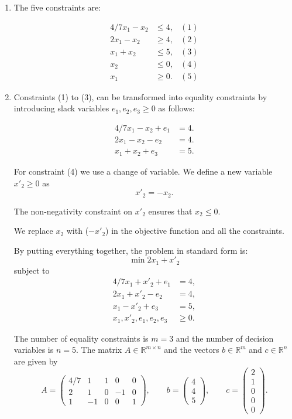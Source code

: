\begin{enumerate}
\item The five constraints are:

\begin{align*}
4/7x_1 - x_2  & \leq 4,& (1)  \\
2x_1  - x_2 & \geq 4,& (2)   \\
x_1+ x_2  & \leq 5, & (3) \\
x_2 &\leq 0, & (4)\\
x_1 &\geq 0. & (5)
\end{align*} 

\item Constraints (1) to (3), can be transformed into equality
  constraints by introducing slack variables $e_1, e_2, e_3 \geq 0$ as
  follows: 

\begin{align*}
4/7x_1 - x_2  + e_1 & = 4.  \\
2x_1  - x_2 - e_2 & = 4.   \\
x_1+ x_2  + e_3 & =5. 
\end{align*} 

For constraint (4) we use a change of variable. We define a new variable $ x'_2 \geq 0 $ as
\begin{equation*}
x'_2 = - x_2.
\end{equation*}

The non-negativity constraint on $ x'_2 $ ensures that $ x_2 \leq 0 $.

We replace $ x_2 $ with ($ -x'_2 $) in the objective function and all the constraints.
 
By putting  everything  together, the  problem in standard form is:
\[
\min  2 x_1 + x'_2
\]
subject to
\begin{align*}
 4/7x_1 + x'_2  + e_1 & = 4,  \\
2x_1  + x'_2 - e_2 & = 4, \\
x_1- x'_2 + e_3 & =5, \\
x_1, x'_2, e_1, e_2, e_3 &\geq 0.
\end{align*}

The number of equality constraints is $m=3$ and the number of decision variables is $n=5$.
The matrix  $A\in\mathbb{R}^{m\times n}$ and the vectors $b\in\mathbb{R}^{m}$ and $c\in\mathbb{R}^{n}$ are given by
\[
A = 
\begin{pmatrix}
4/7 & 1 & 1 & 0 & 0 \\
2 & 1 & 0 & -1 & 0 \\
1 & -1 & 0 & 0 & 1 
\end{pmatrix}, \qquad
b = \begin{pmatrix}
4 \\
4 \\
5 
\end{pmatrix}, \qquad
c = \begin{pmatrix}
2 \\
1 \\
0 \\
0 \\
0 
\end{pmatrix}.
\]


\end{enumerate}
